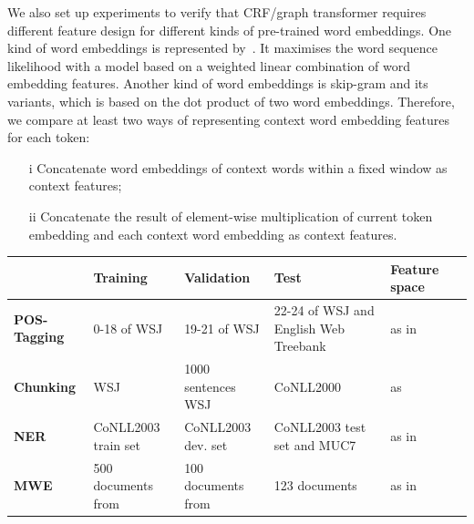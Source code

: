 \documentclass[11pt]{article}
\begin{document}
We also set up experiments to verify that CRF/graph transformer requires different feature design for different kinds of pre-trained word embeddings. One kind of word embeddings is represented by~\cite{bengio2006neural}. It maximises the word sequence likelihood with a model based on a weighted linear combination of word embedding features. Another kind of word embeddings is skip-gram and its variants, which is based on the dot product of two word embeddings. Therefore, we compare at least two ways of representing context word embedding features for each token:

\begin{small}
\begin{itemize}
\item[i] Concatenate word embeddings of context words within a fixed window as context features; 
\item[ii] Concatenate the result of element-wise multiplication of current token embedding and each context word embedding as context features. 
\end{itemize}
\end{small}



\begin{table}
\begin{small}
\begin{tabular}{lllp{3cm}ll}
			& Training & Validation & Test & Feature space \\ \hline
\textbf{POS-Tagging} & 0-18 of WSJ & 19-21 of WSJ & 22-24 of WSJ and English Web Treebank & as in~\cite{collobert2011natural} \\
\textbf{Chunking} & WSJ & 1000 sentences WSJ & CoNLL2000 & as~\cite{turian2010word}\\
\textbf{NER} & CoNLL2003 train set & CoNLL2003 dev. set & CoNLL2003 test set and MUC7 & as in~\cite{turian2010word} \\
\textbf{MWE} & 500 documents from & 100 documents from & 123 documents & as in~\cite{mwecorpus}\\
\hline
\end{tabular}
\end{small}
\end{table}


\end{document}
